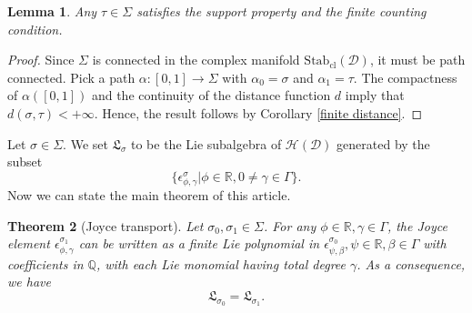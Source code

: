 \documentclass[a4paper,12pt]{amsart}
\numberwithin{equation}{section}
\newtheorem{theorem}{Theorem}[section]
\newtheorem{lemma}[theorem]{Lemma}
\newcommand{\Stab}{\mathrm{Stab}}
\newcommand{\cl}{\mathrm{cl}}
\newcommand{\1}{\mathbf{1}}
\begin{document}
\begin{lemma}\label{one point to the component}
    Any $\tau\in\Sigma$ satisfies the support property and the finite counting condition.
\end{lemma}
\begin{proof}
    Since $\Sigma$ is connected in the complex manifold $\Stab_\cl(\mathcal{D})$, it must be path connected. Pick a path $\alpha:[0,1]\rightarrow\Sigma$ with $\alpha_0=\sigma$ and $\alpha_1=\tau$. The compactness of $\alpha([0,1])$ and the continuity of the distance function $d$ imply that $d(\sigma,\tau)<+\infty$. Hence, the result follows by Corollary \ref{finite distance}.
\end{proof}
Let $\sigma\in\Sigma$. We set $\mathfrak{L}_\sigma$ to be the Lie subalgebra of $\mathcal{H}(\mathcal{D})$ generated by the subset
\[\{\epsilon^\sigma_{\phi,\gamma}|\phi\in\mathbb{R},0\neq\gamma\in\Gamma\}.\]
Now we can state the main theorem of this article.
\begin{theorem}[Joyce transport]\label{Joyce transport}
    Let $\sigma_0,\sigma_1\in\Sigma$. For any $\phi\in\mathbb{R},\gamma\in\Gamma$, the Joyce element $\epsilon^{\sigma_1}_{\phi,\gamma}$ can be written as a finite Lie polynomial in $\epsilon^{\sigma_0}_{\psi,\beta},\psi\in\mathbb{R},\beta\in\Gamma$ with coefficients in $\mathbb{Q}$, with each Lie monomial having total degree $\gamma$. As a consequence, we have
    \[\mathfrak{L}_{\sigma_0}=\mathfrak{L}_{\sigma_1}.\]
\end{theorem}
\end{document}
